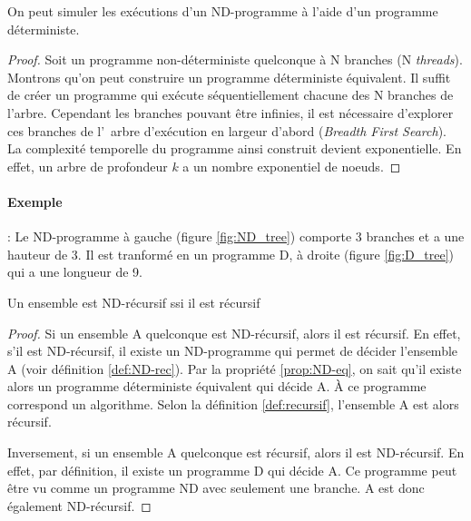 \begin{myprop} \label{prop:ND-eq}
	On peut simuler les exécutions d'un ND-programme à l'aide d'un programme
	déterministe.
	\begin{proof}
		Soit un programme non-déterministe quelconque à N branches (N \textit{threads}).
		Montrons qu'on peut construire un programme déterministe équivalent.
		Il suffit de créer un programme qui exécute séquentiellement chacune des N branches de l'arbre.
		Cependant les branches pouvant être infinies, il est nécessaire d'explorer ces branches de l'\ arbre d'exécution en largeur d'abord (\textit{Breadth First Search}). La complexité temporelle du programme ainsi construit devient exponentielle.  En effet, un arbre de profondeur $k$ a un nombre exponentiel de noeuds.
	\end{proof}
\end{myprop}

\paragraph{Exemple} : Le ND-programme à gauche (figure \ref{fig:ND_tree}) comporte 3 branches et  a une hauteur de 3. Il est tranformé en un programme D, à droite (figure \ref{fig:D_tree}) qui a une longueur de 9. \\
	

\begin{myprop}
	Un ensemble est ND-récursif ssi il est récursif
	\begin{proof}
		Si un ensemble A quelconque est ND-récursif, alors il est récursif.
		En effet, s'il est ND-récursif, il existe un ND-programme qui permet de décider l'ensemble A (voir définition \ref{def:ND-rec}).
		Par la propriété \ref{prop:ND-eq}, on sait qu'il existe alors un programme déterministe équivalent qui décide A. À ce programme correspond un algorithme.
		Selon la définition \ref{def:recursif}, l'ensemble A est alors récursif.

		Inversement, si un ensemble A quelconque est récursif, alors il est ND-récursif. En effet, par définition, il existe un programme D qui décide A.
		Ce programme peut être vu comme un programme ND avec seulement une branche. A est donc également ND-récursif.
	\end{proof}
\end{myprop}

